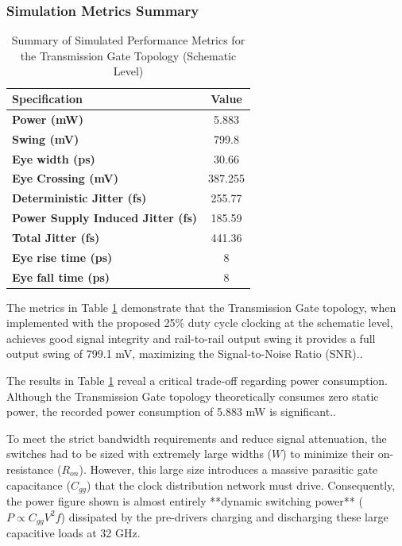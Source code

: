 \documentclass[12pt, a4paper]{report}
\begin{document}
\subsubsection{Simulation Metrics Summary}
\label{subsubsec:tg_sim_metrics}

\begin{table}[H]
    \centering
    \caption{Summary of Simulated Performance Metrics for the Transmission Gate Topology (Schematic Level)}
    \label{tab:tg_metrics}
    \renewcommand{\arraystretch}{1.4} %
    \setlength{\tabcolsep}{12pt}      %
    \begin{tabular}{|l|c|}
        \hline
        \textbf{Specification} & \textbf{Value} \\ \hline
        \textbf{Power (mW)} & 5.883 \\ \hline
        \textbf{Swing (mV)} & 799.8 \\ \hline
        \textbf{Eye width (ps)} & 30.66 \\ \hline
        \textbf{Eye Crossing (mV)} & 387.255 \\ \hline
        \textbf{Deterministic Jitter (fs)} & 255.77 \\ \hline
        \textbf{Power Supply Induced Jitter (fs)} & 185.59 \\ \hline
        \textbf{Total Jitter (fs)} & 441.36 \\ \hline
        \textbf{Eye rise time (ps)} & 8 \\ \hline
        \textbf{Eye fall time (ps)} & 8 \\ \hline
    \end{tabular}
\end{table}

The metrics in Table \ref{tab:tg_metrics} demonstrate that the Transmission Gate topology, when implemented with the proposed 25\% duty cycle clocking at the schematic level, achieves good signal integrity and rail-to-rail output swing it provides a full output swing of 799.1 mV, maximizing the Signal-to-Noise Ratio (SNR)..

The results in Table \ref{tab:tg_metrics} reveal a critical trade-off regarding power consumption. Although the Transmission Gate topology theoretically consumes zero static power, the recorded power consumption of 5.883 mW is significant.. 

To meet the strict bandwidth requirements and reduce signal attenuation, the switches had to be sized with extremely large widths ($W$) to minimize their on-resistance ($R_{on}$). However, this large size introduces a massive parasitic gate capacitance ($C_{gg}$) that the clock distribution network must drive. Consequently, the power figure shown is almost entirely **dynamic switching power** ($P \propto C_{gg} V^2 f$) dissipated by the pre-drivers charging and discharging these large capacitive loads at 32 GHz.
\end{document}
